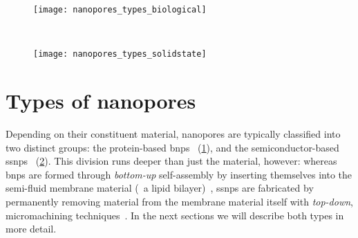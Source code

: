 %
\begin{figure*}[b]
  \centering
  \medskip
  \begin{subfigure}[b]{115mm}
    \centering
    \caption{}\vspace{-2.5mm}\label{fig:nanopores_types_biological}
    \texttt{[image: nanopores\_types\_biological]}
  \end{subfigure}
  \\ \vspace{-1mm}
  \begin{subfigure}[b]{115mm}
    \centering
    \caption{}\vspace{-2.5mm}\label{fig:nanopores_types_solidstate}
    \texttt{[image: nanopores\_types\_solidstate]}
  \end{subfigure}
%
\caption[Types of nanopores.]{%
  \textbf{Types of nanopores.}
  Cross-sectional (left) and top (right) views for a fully atomistic representation of 
  ()
  a Cytolysin A (ClyA) biological nanopore (orange) embedded in a lipid bilayer (green), and
  ()
  a double-conical solid-state nanopore drilled through a \SI{7}{\nm}-thick  membrane (green and
  gray spheres).
  Both pores are surrounded by a \SI{0.15}{\Molar} electrolyte solution containing cations (blue spheres),
  anions (red spheres), and water molecules (light blue spheres). Note that for clarity, only the water
  molecules behind the pore are shown, represented by their oxygen atom.
  Molecular structures were prepared and rendered using \gls{namd}~\cite{Phillips-2005} and
  \gls{vmd}~\cite{Humphrey-1996,Stone-1998}.
  }\label{fig:nanopores_types}
\end{figure*}
%


%
%
\section{Types of nanopores}
%
\label{sec:np:types}
%

Depending on their constituent material, nanopores are typically classified into two distinct groups: the
protein-based \glspl{bnp}~\cite{Willems-VanMeervelt-2017} (\cref{fig:nanopores_types_biological}), and the
semiconductor-based \glspl{ssnp}~\cite{Dekker-2007} (\cref{fig:nanopores_types_solidstate}). This division
runs deeper than just the material, however: whereas \glspl{bnp} are formed through \emph{bottom-up}
self-assembly by inserting themselves into the semi-fluid membrane material (\eg~a lipid
bilayer)~\cite{Howorka-2017}, \glspl{ssnp} are fabricated by permanently removing material from the membrane
material itself with \emph{top-down}, micromachining techniques~\cite{Dekker-2007}. In the next sections we
will describe both types in more detail.


